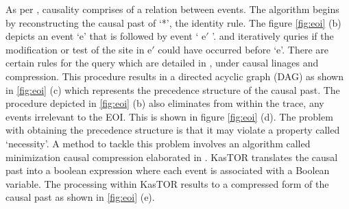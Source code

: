 \documentclass[msc,deptreport,ai]{infthesis}      %
\begin{document}
As per \cite{kappaPlatform}, causality comprises of a relation between events. The algorithm begins by reconstructing the causal past of `*', the identity rule. The figure \ref{fig:eoi} (b) depicts an event `e' that is followed by event ` e$'$ '. and iteratively quries if the modification or test of the site in e$'$  could have occurred before `e'. There are certain rules for the query which are detailed in \cite{kappaPlatform}, under causal linages and compression. This procedure results in a directed acyclic graph (DAG) as shown in \ref{fig:eoi} (c) which represents the precedence structure of the causal past. The procedure depicted in \ref{fig:eoi} (b) also eliminates from within the trace, any events irrelevant to the EOI. This is shown in figure \ref{fig:eoi} (d). The problem with obtaining the precedence structure is that it may violate a property called `necessity'. A method to tackle this problem involves an algorithm called minimization causal compression elaborated in \cite{danos2012graphs}. KasTOR translates the causal past into a boolean expression where each event is associated with a Boolean variable. The processing within KasTOR results to a compressed form of the causal past as shown in  \ref{fig:eoi} (e).
\end{document}
